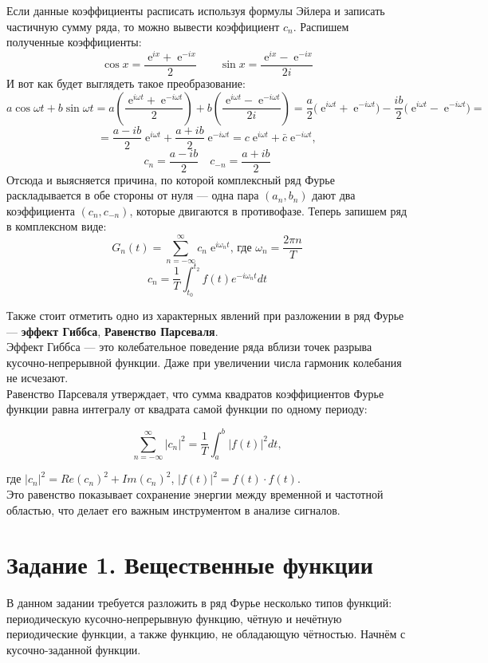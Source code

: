 \documentclass[a4paper]{article}
\newcommand{\e}{\;\text{e}}
\begin{document}
Если данные коэффициенты расписать используя формулы Эйлера и записать частичную сумму ряда, то можно вывести коэффициент $c_n$. Распишем полученные коэффициенты:
$$\cos x = \frac{\e^{ix} + \e^{-ix}}{2}\qquad\sin x = \frac{\e^{ix} - \e^{-ix}}{2i}$$
И вот как будет выглядеть такое преобразование:
$$a\cos\omega t + b\sin\omega t = a\left( \frac{\e^{i\omega t} + \e^{-i\omega t}}{2} \right) + b\left( \frac{\e^{i\omega t} - \e^{-i\omega t}}{2i} \right) = \frac{a}{2}\bigg( \e^{i\omega t} + \e^{-i\omega t} \bigg) - \frac{ib}{2}\bigg( \e^{i\omega t} - \e^{-i\omega t} \bigg) =$$
$$= \frac{a - ib}{2}\e^{i\omega t}+\frac{a+ib}{2}\e^{-i\omega t} = c\e^{i\omega t} + \bar{c}\e^{-i\omega t},$$ $$c_n=\frac{a-ib}{2} \quad c_{-n}=\frac{a+ib}{2}$$
Отсюда и выясняется причина, по которой комплексный ряд Фурье раскладывается в обе стороны от нуля --- одна пара $\left( a_n, b_n \right)$ дают два коэффициента $\left( c_n, c_{-n} \right)$, которые двигаются в противофазе.
Теперь запишем ряд в комплексном виде:
$$G_n(t) = \sum_{n=-\infty}^{\infty}c_n\e^{i\omega_nt}\text{, где }\omega_n = \frac{2\pi n}{T}$$
$$c_n = \frac{1}{T} \int_{t_0}^{t_2} f(t) e^{-i \omega_n t} dt$$

Также стоит отметить одно из характерных явлений при разложении в ряд Фурье --- \textbf{эффект Гиббса}, \textbf{Равенство Парсеваля}.\\[0.5em]
Эффект Гиббса --- это колебательное поведение ряда вблизи точек разрыва кусочно-непрерывной функции. Даже при увеличении числа гармоник колебания не исчезают.\\[0.5em]
Равенство Парсеваля утверждает, что сумма квадратов коэффициентов Фурье функции равна интегралу от квадрата самой функции по одному периоду:

\begin{equation}
    \sum_{n=-\infty}^{\infty} |c_n|^2 = \frac{1}{T} \int_{a}^{b} |f(t)|^2 dt,
\end{equation}

где $|c_n|^2 = Re(c_n)^2+Im(c_n)^2$, $|f(t)|^2 = f(t) \cdot f(t)$.\\[0.5em]
Это равенство показывает сохранение энергии между временной и частотной областью, что делает его важным инструментом в анализе сигналов.

\section{Задание 1. Вещественные функции}
В данном задании требуется разложить в ряд Фурье несколько типов функций: периодическую кусочно-непрерывную функцию, чётную и нечётную периодические функции, а также функцию, не обладающую чётностью. Начнём с кусочно-заданной функции.
\end{document}
